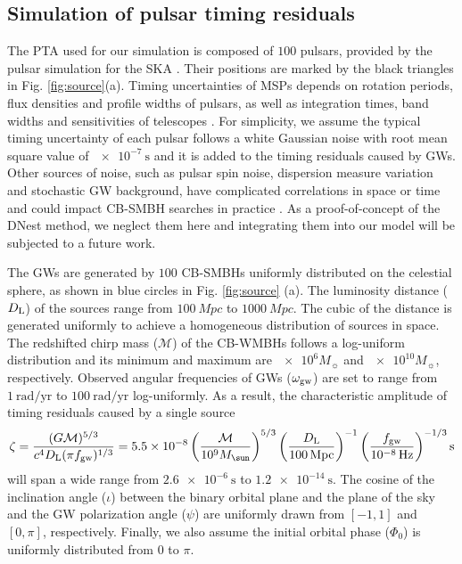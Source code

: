 \documentclass[times,tight]{aastex631}
\begin{document}
\subsection{Simulation of pulsar timing residuals \label{subsec:simu}}
The PTA used for our simulation is composed of $100$ pulsars, provided by the pulsar simulation for the SKA \citep{smits2009}.
Their positions are marked by the black triangles in Fig. \ref{fig:source}(a).
Timing uncertainties of MSPs depends on rotation periods, flux densities and profile widths of pulsars, as well as integration times, band widths and sensitivities of telescopes \citep{wang2018}.
For simplicity, we assume the typical timing uncertainty of each pulsar follows a white Gaussian noise with root mean square value of $\SI{e-7}{\second}$ and it is added to the timing residuals caused by GWs.
Other sources of noise, such as pulsar spin noise, dispersion measure variation and stochastic GW background, have complicated correlations in space or time \citep{tiburzi2016} and could impact CB-SMBH searches in practice \citep{becsy2020}.
As a proof-of-concept of the DNest method, we neglect them here and integrating them into our model will be subjected to a future work.

The GWs are generated by $100$ CB-SMBHs uniformly distributed on the celestial sphere, as shown in blue circles in Fig. \ref{fig:source} (a).
The luminosity distance ($D_{\rm L}$) of the sources range from $\SI{100}{Mpc}$ to $\SI{1000}{Mpc}$.
The cubic of the distance is generated uniformly to achieve a homogeneous distribution of sources in space.
The redshifted chirp mass ($\mathcal{M}$) of the CB-WMBHs follows a log-uniform distribution and its minimum and maximum are $\num{e6}M_{\sun}$ and $\num{e10}M_{\sun}$, respectively.
Observed angular frequencies of GWs ($\omega_{\rm gw}$) are set to range from $\SI{1}{\radian\per\text{yr}}$ to $\SI{100}{\radian\per\text{yr}}$ log-uniformly.
As a result, the characteristic amplitude of timing residuals caused by a single source 
\begin{equation}
\zeta = \frac{(G\mathcal{M})^{5/3}}{c^4 D_{\rm L} (\pi f_{\rm gw})^{1/3}}
= \num{5.5e-8} \left(\frac{\mathcal{M}}{\num{e9}M_{\sun}}\right)^{5/3}
\left(\frac{D_{\rm L}}{\SI{100}{Mpc}}\right)^{-1} 
\left(\frac{f_{\rm gw}}{\SI{e-8}{\hertz}}\right)^{-1/3} \si{\second}
\end{equation}
will span a wide range from $\SI{2.6e-6}{\second}$ to $\SI{1.2e-14}{\second}$.
The cosine of the inclination angle ($\iota$) between the binary orbital plane and the plane of the sky and the GW polarization angle ($\psi$) are uniformly drawn from $[-1,1]$ and $[0, \pi]$, respectively.
Finally, we also assume the initial orbital phase ($\Phi_0$) is uniformly distributed from $0$ to $\pi$.
\end{document}
